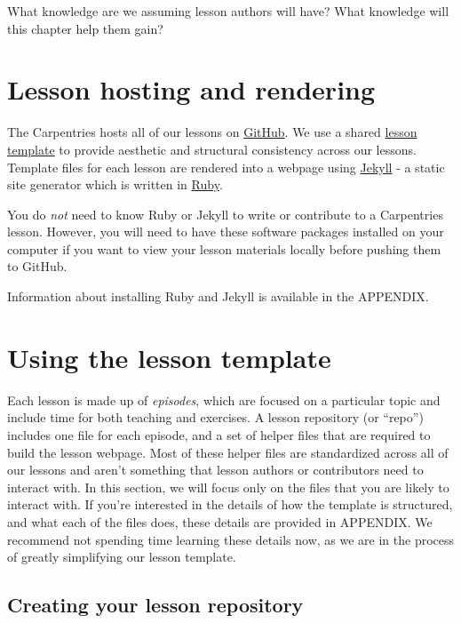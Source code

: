 \documentclass[]{book}
\begin{document}
What knowledge are we assuming lesson authors will have?
What knowledge will this chapter help them gain?

\hypertarget{lesson-hosting-and-rendering}{%
\section{Lesson hosting and rendering}\label{lesson-hosting-and-rendering}}

The Carpentries hosts all of our lessons on \href{https://github.com}{GitHub}. We use a
shared \href{http://carpentries.github.io/lesson-example/setup.html}{lesson template} to provide aesthetic and structural
consistency across our lessons. Template files for each lesson are
rendered into a webpage using \href{https://jekyllrb.com/}{Jekyll} -
a static site generator which is written in \href{https://www.ruby-lang.org/en/}{Ruby}.

You do \emph{not} need to know Ruby or Jekyll to write
or contribute to a Carpentries lesson. However, you will need to
have these software packages installed on your computer if you
want to view your lesson materials locally before pushing them
to GitHub.

Information about installing Ruby and Jekyll is available in the APPENDIX.

\hypertarget{using-the-lesson-template}{%
\section{Using the lesson template}\label{using-the-lesson-template}}

Each lesson is made up of \emph{episodes}, which are focused on a
particular topic and
include time for both teaching and exercises. A lesson repository
(or ``repo'') includes one file for each episode,
and a set of helper files that are required to build
the lesson webpage. Most of these helper files are standardized
across all of our lessons and aren't something that lesson
authors or contributors need to interact with. In this section,
we will focus only on the files that you are likely to
interact with. If you're interested in the details
of how the template is structured, and what each of the files
does, these details are provided in APPENDIX. We recommend not
spending time learning these details now, as we are in the
process of greatly simplifying our lesson template.

\hypertarget{creating-your-lesson-repository}{%
\subsection{Creating your lesson repository}\label{creating-your-lesson-repository}}
\end{document}
